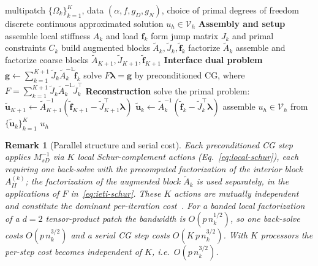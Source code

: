 \documentclass{article}
\newcommand{\vect}[1]{\boldsymbol{#1}}
\newcommand{\npatch}{K} %
\newcommand{\patchdom}[1]{\Omega_{#1}}            %
\newcommand{\Vglo}{\mathcal{V}_h}                  %
\newcommand{\Aloc}[1]{A_{#1}}                    %
\newcommand{\Aaug}[1]{\widetilde{A}_{#1}}        %
\newcommand{\floc}[1]{\vect{f}_{#1}}             %
\newcommand{\faug}[1]{\widetilde{\vect{f}}_{#1}} %
\newcommand{\Jloc}[1]{J_{#1}}                    %
\newcommand{\Jaug}[1]{\widetilde{J}_{#1}}        %
\newcommand{\Cloc}[1]{C_{#1}}                    %
\newcommand{\Fschur}{F}                           %
\newcommand{\gschur}{\vect{g}}                    %
\newcommand{\Psd}{M_{sD}^{-1}}                   %
\newcommand{\uaug}[1]{\widetilde{\vect{u}}_{#1}} %
\newcommand{\lagmult}{\vect{\lambda}}             %
\theoremstyle{plain}
\newtheorem{rmk}{Remark}
\numberwithin{equation}{section}
\begin{document}
\begin{algorithm}[t]
    \caption{IETI-DP solver for the model problem~\eqref{eq:poisson-strong}.}
    \label{alg:ieti-dp}
    \begin{algorithmic}[1]
        \Require multipatch $\{\patchdom{k}\}_{k=1}^{\npatch}$, data $(\alpha, f, g_D, g_N)$,
        choice of primal degrees of freedom
        \Ensure  discrete continuous approximated solution $u_h \in \Vglo$
        \vspace{0.2cm}
        \Statex \textbf{Assembly and setup}
        \ParFor{k = 1, \dots, \npatch} 
        \State assemble local stiffness $\Aloc{k}$ and load $\floc{k}$
        \State form jump matrix $\Jloc{k}$ and primal constraints $\Cloc{k}$
        \State build augmented blocks $\Aaug{k}, \Jaug{k},
            \faug{k}$ 
        \State factorize $\Aaug{k}$ 
        \EndParFor
        \State assemble and factorize coarse blocks $\Aaug{\npatch+1},
            \Jaug{\npatch+1}, \faug{\npatch+1}$ 
        \vspace{0.2cm}
        \Statex \textbf{Interface dual problem}
        \State $\gschur \gets \sum_{k=1}^{\npatch+1} \Jaug{k}
            \Aaug{k}^{-1} \faug{k}$ 
        \State solve $\Fschur \lagmult = \gschur$ by preconditioned CG, where $\Fschur = \sum_{k=1}^{\npatch+1} \Jaug{k} \Aaug{k}^{-1} \Jaug{k}^{\top}$
        \vspace{0.2cm}
        \Statex \textbf{Reconstruction}
        \State solve the primal problem:
        $\uaug{\npatch+1} \gets \Aaug{\npatch+1}^{-1}
            (\faug{\npatch+1} - \Jaug{\npatch+1}^{\top} \lagmult)$ 
        \ParFor{k = 1, \dots, \npatch} 
        \State $\uaug{k} \gets \Aaug{k}^{-1}
            (\faug{k} - \Jaug{k}^{\top} \lagmult)$
        \EndParFor
        \State assemble $u_h \in \Vglo$ from $\{\uaug{k}\}_{k=1}^{\npatch}$
        \State \Return $u_h$
    \end{algorithmic}
\end{algorithm}

\begin{rmk}[Parallel structure and serial cost] \label{rmk:schur-cost}
    Each preconditioned CG step applies $\Psd$ via $\npatch$ local
    Schur-complement actions (Eq.~\eqref{eq:local-schur}), each requiring one
    back-solve with the precomputed factorization of the \emph{interior} block
    $A^{(k)}_{II}$; the factorization of the augmented block $\Aaug{k}$ is used
    separately, in the applications of $\Fschur$ in~\eqref{eq:ieti-schur}.
    These $\npatch$ actions are mutually independent and constitute the dominant
    per-iteration cost~\cite[\S4.5]{kleiss2012ieti}.
    For a banded local factorization of a $d=2$ tensor-product patch the
    bandwidth is $O(p\,n_k^{1/2})$, so one back-solve costs $O(p\,n_k^{3/2})$ and
    a serial CG step costs $O(\npatch\, p\,n_k^{3/2})$.
    With $\npatch$ processors the per-step cost becomes independent of
    $\npatch$, i.e.\ $O(p\,n_k^{3/2})$.
\end{rmk}
\end{document}
